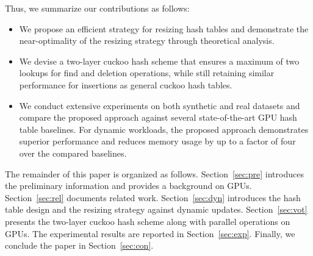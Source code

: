 
Thus, we summarize our contributions as follows:
\begin{itemize}
	\item We propose an efficient strategy for resizing hash tables and demonstrate the near-optimality of the resizing strategy through theoretical analysis.
	\item We devise a two-layer cuckoo hash scheme that ensures a maximum of two lookups for find and deletion operations, while still retaining similar performance for insertions as general cuckoo hash tables. 
	\item We conduct extensive experiments on both synthetic and real datasets and compare the proposed approach against several state-of-the-art GPU hash table baselines. For dynamic workloads, the proposed approach demonstrates superior performance and reduces memory usage by up to a factor of four over the compared baselines.
\end{itemize}

The remainder of this paper is organized as follows. Section~\ref{sec:pre} introduces the preliminary information and provides a background on GPUs. 
Section~\ref{sec:rel} documents related work.
Section~\ref{sec:dyn} introduces the hash table design and the resizing strategy against dynamic updates.
Section~\ref{sec:vot} presents the two-layer cuckoo hash scheme along with parallel operations on GPUs. The experimental results are reported in Section~\ref{sec:exp}. Finally, we conclude the paper in Section~\ref{sec:con}.